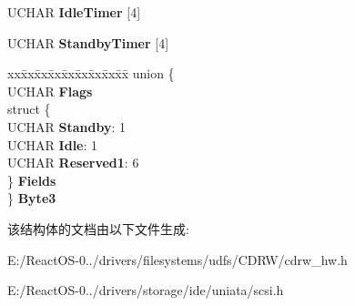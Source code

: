 \begin{DoxyCompactItemize}
\begin{tabbing}
\end{tabbing}\item 
\mbox{\label{struct___m_o_d_e___p_o_w_e_r___c_o_n_d_i_t_i_o_n___p_a_g_e_ae35b5614352ef93537da64acd6578b3f}} 
U\+C\+H\+AR {\bfseries Idle\+Timer} \mbox{[}4\mbox{]}
\item 
\mbox{\label{struct___m_o_d_e___p_o_w_e_r___c_o_n_d_i_t_i_o_n___p_a_g_e_af93e3b28980bcbcd79a7fc58e202d912}} 
U\+C\+H\+AR {\bfseries Standby\+Timer} \mbox{[}4\mbox{]}
\item 
\mbox{\label{struct___m_o_d_e___p_o_w_e_r___c_o_n_d_i_t_i_o_n___p_a_g_e_a632b46aa2dcb0824a65e2eda95c2534d}} 
\begin{tabbing}
xx\=xx\=xx\=xx\=xx\=xx\=xx\=xx\=xx\=\kill
union \{\\
\>UCHAR {\bfseries Flags}\\
\>struct \{\\
\>\>UCHAR {\bfseries Standby}: 1\\
\>\>UCHAR {\bfseries Idle}: 1\\
\>\>UCHAR {\bfseries Reserved1}: 6\\
\>\} {\bfseries Fields}\\
\} {\bfseries Byte3}\\

\end{tabbing}\end{DoxyCompactItemize}


该结构体的文档由以下文件生成\+:\begin{DoxyCompactItemize}
\item 
E\+:/\+React\+O\+S-\/0../drivers/filesystems/udfs/\+C\+D\+R\+W/cdrw\+\_\+hw.\+h\item 
E\+:/\+React\+O\+S-\/0../drivers/storage/ide/uniata/scsi.\+h\end{DoxyCompactItemize}
